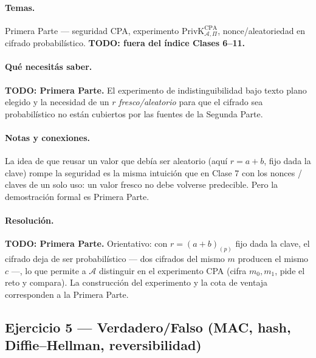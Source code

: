 \paragraph{Temas.}
Primera Parte — seguridad CPA, experimento $\mathrm{PrivK}^{\mathrm{CPA}}_{\mathcal{A},\Pi}$,
nonce/aleatoriedad en cifrado probabilístico. \textbf{TODO: fuera del índice Clases 6--11.}

\paragraph{Qué necesitás saber.}
\textbf{TODO: Primera Parte.} El experimento de indistinguibilidad bajo texto plano elegido y la
necesidad de un $r$ \emph{fresco/aleatorio} para que el cifrado sea probabilístico no están
cubiertos por las fuentes de la Segunda Parte.

\paragraph{Notas y conexiones.}
La idea de que reusar un valor que debía ser aleatorio (aquí $r=a+b$, fijo dada la clave) rompe la
seguridad es la misma intuición que en Clase 7 con los nonces / claves de un solo uso: un valor
fresco no debe volverse predecible. Pero la demostración formal es Primera Parte.

\paragraph{Resolución.}
\textbf{TODO: Primera Parte.} Orientativo: con $r=(a+b)_{(p)}$ fijo dada la clave, el cifrado deja
de ser probabilístico — dos cifrados del mismo $m$ producen el mismo $c$ —, lo que permite a
$\mathcal{A}$ distinguir en el experimento CPA (cifra $m_0,m_1$, pide el reto y compara). La
construcción del experimento y la cota de ventaja corresponden a la Primera Parte.

\subsection{Ejercicio 5 — Verdadero/Falso (MAC, hash, Diffie--Hellman, reversibilidad)}

